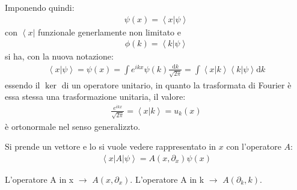 Imponendo quindi:
\begin{equation}\begin{split}
\psi \left(x\right)=\left\langle x|\psi  \right\rangle
\end{split}\end{equation}
con $\left\langle x\right |$ funzionale generlamente non limitato e
\begin{equation}\begin{split}
\phi \left(k\right)=\left\langle k|\psi  \right\rangle
\end{split}\end{equation}
si ha, con la nuova notazione:
\begin{equation}\begin{split}
\left\langle x|\psi  \right\rangle=\psi \left(x\right)=\int{e^{ikx}\psi \left(k\right)\frac{\textrm{d}k}{\sqrt{2\pi}}}=\int{\left\langle x|k \right\rangle\left\langle k|\psi  \right\rangle \textrm{d}k}
\end{split}\end{equation}
essendo il $\ker$ di un operatore unitario, in quanto la trasformata di Fourier è essa stessa una trasformazione unitaria, il valore:
\begin{equation}\begin{split}
\frac{e^{ikx}}{\sqrt{2\pi}}=\left\langle x|k \right\rangle=u_k\left(x\right)
\end{split}\end{equation}
è ortonormale nel senso generalizzto.

Si prende un vettore e lo si vuole vedere rappresentato in $x$ con l'operatore $A$:
\begin{equation}\begin{split}
\left\langle x|A|\psi  \right\rangle=A\left(x,\partial _x\right)\psi \left(x\right)
\end{split}\end{equation}

L'operatore A in x $\rightarrow$ $A\left(x,\partial _x\right)$. L'operatore A in k $\rightarrow$ $A\left(\partial _k,k\right)$.

